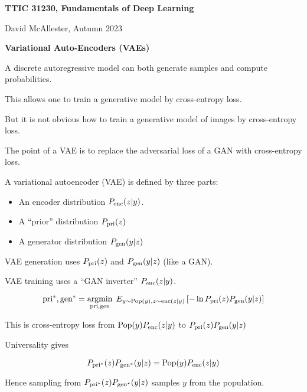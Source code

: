 




{\Huge

  \centerline{\bf TTIC 31230, Fundamentals of Deep
  Learning} \bigskip \centerline{David McAllester, Autumn
  2023} \vfill \vfill \centerline{\bf Variational Auto-Encoders
  (VAEs)} \vfill \vfill


A discrete autoregressive model can both generate samples and compute probabilities.

\vfill
This allows one to train a generative model by cross-entropy loss.

\vfill
But it is not obvious how to train a generative model of images by cross-entropy loss.

\vfill
{\color{red} The point of a VAE is to replace the adversarial loss of a GAN
with cross-entropy loss.}

A variational autoencoder (VAE) is defined by three parts:

\vfill
\begin{itemize}
\item An encoder distribution $P_{\mathrm{enc}}(z|y)$.

\vfill
\item A ``prior'' distribution $P_{\mathrm{pri}}(z)$

\vfill
\item A generator distribution $P_{\mathrm{gen}}(y|z)$
\end{itemize}

\vfill
VAE generation uses $P_{\mathrm{pri}}(z)$ and $P_{\mathrm{gen}}(y|z)$ (like a GAN).

\vfill
VAE training uses a ``GAN inverter'' $P_{\mathrm{enc}}(z|y)$.

$$\mathrm{pri}^*,\mathrm{gen}^* = \operatorname*{argmin}_{\mathrm{pri},\mathrm{gen}}\;E_{y \sim \mathrm{Pop}(y),z \sim \mathrm{enc}(z|y)}\left[-\ln P_{\mathrm{pri}}(z)P_{\mathrm{gen}}(y|z)\right]$$

\vfill
This is cross-entropy loss from $\mathrm{Pop}(y)P_{\mathrm{enc}}(z|y)$ to $P_{\mathrm{pri}}(z)P_{\mathrm{gen}}(y|z)$

\vfill
Universality gives

{\color{red} $$P_{\mathrm{pri}^*}(z)P_{\mathrm{gen}^*}(y|z) = \mathrm{Pop}(y)P_{\mathrm{enc}}(z|y)$$}

\vfill
Hence sampling from $P_{\mathrm{pri}^*}(z)P_{\mathrm{gen}^*}(y|z)$ samples $y$ from the population.



}
